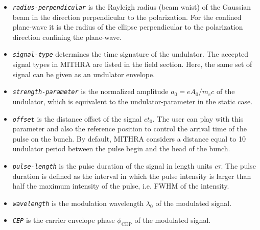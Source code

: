 \begin{enumerate}
\begin{itemize}
	\item {\tt \small \em radius-perpendicular} is the Rayleigh radius (beam waist) of the Gaussian beam in the direction perpendicular to the polarization. For the confined plane-wave it is the radius of the ellipse perpendicular to the polarization direction confining the plane-wave.
	\item {\tt \small \em signal-type} determines the time signature of the undulator. The accepted signal types in MITHRA are listed in the field section. Here, the same set of signal can be given as an undulator envelope.
	\item {\tt \small \em strength-parameter} is the normalized amplitude $a_0 = e A_0 / m_ec $ of the undulator, which is equivalent to the undulator-parameter in the static case.
	\item {\tt \small \em offset} is the distance offset of the signal $ct_0$. The user can play with this parameter and also the reference position to control the arrival time of the pulse on the bunch. By default, MITHRA considers a distance equal to 10 undulator period between the pulse begin and the head of the bunch.
	\item {\tt \small \em pulse-length} is the pulse duration of the signal in length units $c\tau$. The pulse duration is defined as the interval in which the pulse intensity is larger than half the maximum intensity of the pulse, i.e. FWHM of the intensity.
	\item {\tt \small \em wavelength} is the modulation wavelength $\lambda_0$ of the modulated signal.
	\item {\tt \small \em CEP} is the carrier envelope phase $\phi_{\mathrm{CEP}}$ of the modulated signal.
\end{itemize}
%
\end{enumerate}

